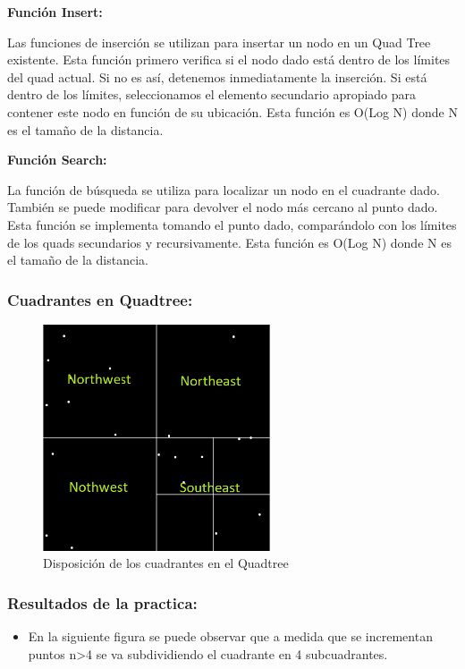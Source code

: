 \documentclass{article}
\begin{document}
\textbf{Función Insert:}

Las funciones de inserción se utilizan para insertar un nodo en un Quad Tree existente. Esta función primero verifica si el nodo dado está dentro de los límites del quad actual. Si no es así, detenemos inmediatamente la inserción. Si está dentro de los límites, seleccionamos el elemento secundario apropiado para contener este nodo en función de su ubicación. Esta función es O(Log N) donde N es el tamaño de la distancia.


\textbf{Función Search:}

La función de búsqueda se utiliza para localizar un nodo en el cuadrante dado. También se puede modificar para devolver el nodo más cercano al punto dado. Esta función se implementa tomando el punto dado, comparándolo con los límites de los quads secundarios y recursivamente. Esta función es O(Log N) donde N es el tamaño de la distancia.

\subsubsection{Cuadrantes en Quadtree: }

\begin{figure}[htbp]
\centering
\includegraphics[width=0.6\textwidth]{img/quadtree_cuadrante.png}
\caption{Disposición de los cuadrantes en el Quadtree}
\label{fig:quadtree_cuadrante}
\end{figure}

\subsubsection{Resultados de la practica: }

\begin{itemize}
\item En la siguiente figura se puede observar que a medida que se incrementan puntos n>4 se va subdividiendo el cuadrante en 4 subcuadrantes.
\end{itemize}
\end{document}
